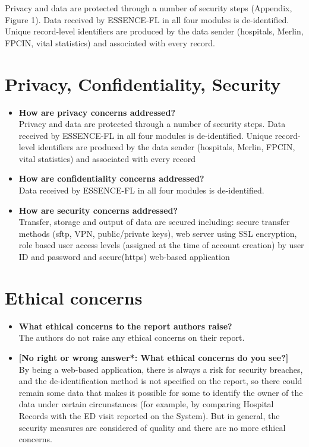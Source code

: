\documentclass{article}
\begin{document}
Privacy and data are protected through a number of security steps (Appendix, Figure 1).
Data received by ESSENCE-FL in all four modules is de-identified. Unique record-level
identifiers are produced by the data sender (hospitals, Merlin, FPCIN, vital statistics) and associated with every record.

\section{Privacy, Confidentiality, Security}
\begin{itemize}
\item{\textbf{How are privacy concerns addressed?}}\\
Privacy and data are protected through a number of security steps. Data received by ESSENCE-FL in all four modules is de-identified. Unique record-level identifiers are produced by the data sender (hospitals, Merlin, FPCIN, vital statistics) and associated with every record

\item{\textbf{How are confidentiality concerns addressed?}}\\
Data received by ESSENCE-FL in all four modules is de-identified.

\item{\textbf{How are security concerns addressed?}}\\
Transfer, storage and output of data are secured including: secure
transfer methods (sftp, VPN, public/private keys), web server using SSL encryption, role based
user access levels (assigned at the time of account creation) by user ID and password and secure(https) web-based application
\end{itemize}
\pagebreak

\section{Ethical concerns}
\begin{itemize}

\item{\textbf{What ethical concerns to the report authors raise?}}\\
The authors do not raise any ethical concerns on their report.

\item{\textbf{[No right or wrong answer*: What ethical concerns do you see?]}}\\
By being a web-based application, there is always a risk for security breaches, and the de-identification method is not specified on the report, so there could remain some data that makes it possible for some to identify the owner of the data under certain circunstances (for example, by comparing Hospital Records with the ED visit reported on the System). But in general, the security measures are considered of quality and there are no more ethical concerns.
\end{itemize}
\end{document}
